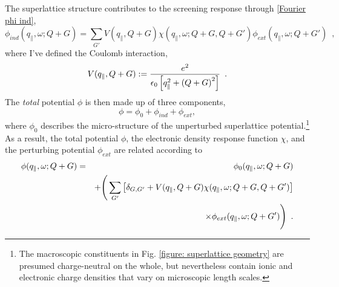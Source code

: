 The superlattice structure contributes to the screening response through \eqref{Fourier phi ind},
\begin{equation}
    \label{planar phi ind}
     \phi_{ind}(q_\parallel,\omega;Q+G) = \sum_{G'}V(q_\parallel,Q+G)\chi(q_\parallel,\omega;Q+G, Q+G')
     \phi_{ext}(q_\parallel,\omega;Q+G')
     \,\,\,,
\end{equation}
where I've defined the Coulomb interaction,
\begin{equation}
    \label{V def}
    V(q_\parallel,Q+G):=
    \frac{e^2}{\epsilon_0\left[ q_\parallel^2+\left( Q+G\right)^2\right]}
    \,\,\,.
\end{equation}
The {\it total} potential $\phi$ is then made up of three components,
\begin{equation}
    \label{total potential def}
    \phi = \phi_0 + \phi_{ind} + \phi_{ext},
\end{equation}
where $\phi_0$ describes the micro-structure of the unperturbed superlattice potential.\footnote{The macroscopic constituents in Fig. \ref{figure: superlattice geometry} are presumed charge-neutral on the whole, but nevertheless contain ionic and electronic charge densities that vary on microscopic length scales.}  As a result, the total potential $\phi$, the electronic density response function $\chi$, and the perturbing potential $\phi_{ext}$ are related according to
\begin{eqnarray}
    \label{planar phi to phi ext relation}
    \nonumber 
    \phi(q_\parallel,\omega;Q+G) 
    &=&
    \phi_0(q_\parallel, \omega; Q+G) 
    \\ \nonumber &\,& +
    \Bigg(\sum_{G'}
    \left[
    \delta_{G,G'}
    +
    V(q_\parallel,Q+G)
    \chi(q_\parallel,\omega;Q+G, Q+G')
    \right]
    \\ &\,&
    \times
    \phi_{ext}(q_\parallel,\omega;Q+ G')\Bigg)
    \,\,\,.
\end{eqnarray}

